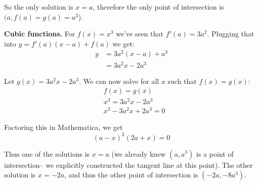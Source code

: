 So the only solution is $x=a$, therefore the only point of
intersection is $(a, f(a)=g(a)=a^2$).

\vs

\textbf{Cubic functions.} For $f(x)=x^3$ we've seen that
$f'(a)=3a^2$. Plugging that into $y=f'(a)(x-a)+f(a)$ we get:
\begin{align*}
  y&=3a^2(x-a)+a^3\\
   &=3a^2x-2a^3
\end{align*}

Let $g(x)=3a^2x-2a^3$. We can now solve for all $x$ such that
$f(x)=g(x)$:
\begin{align*}
  &f(x)=g(x)\\
  &x^3=3a^2x-2a^3\\
  &x^3-3a^2x+2a^3=0
\end{align*}

Factoring this in Mathematica, we get
\[(a-x)^2(2a+x)=0\]

Thus one of the solutions is $x=a$ (we already knew $(a, a^3)$ is a
point of intersection-- we explicitly constructed the tangent line at
this point). The other solution is $x=-2a$, and thus the other point
of intersection is $(-2a, -8a^3)$.

